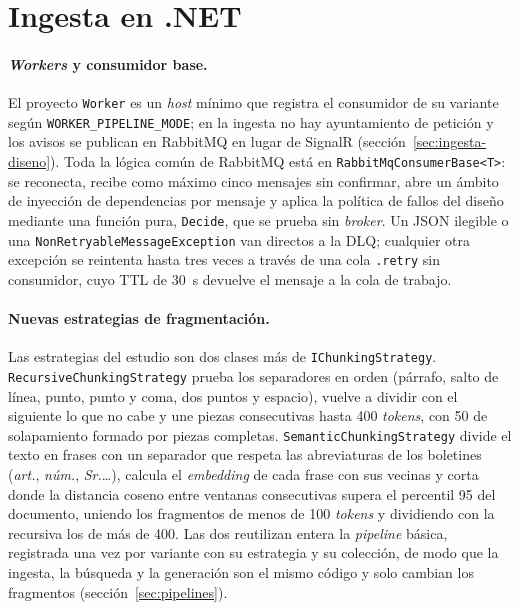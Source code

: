 \section{Ingesta en .NET}
\label{sec:impl-ingesta-detalle}

\paragraph{\emph{Workers} y consumidor base.} El proyecto \texttt{Worker} es un \emph{host} mínimo que registra el consumidor de su variante según \texttt{WORKER\_PIPELINE\_MODE}; en la ingesta no hay ayuntamiento de petición y los avisos se publican en RabbitMQ en lugar de SignalR (sección~\ref{sec:ingesta-diseno}). Toda la lógica común de RabbitMQ está en \texttt{RabbitMqConsumerBase<T>}: se reconecta, recibe como máximo cinco mensajes sin confirmar, abre un ámbito de inyección de dependencias por mensaje y aplica la política de fallos del diseño mediante una función pura, \texttt{Decide}, que se prueba sin \emph{broker}. Un JSON ilegible o una \texttt{NonRetryableMessageException} van directos a la DLQ; cualquier otra excepción se reintenta hasta tres veces a través de una cola \texttt{.retry} sin consumidor, cuyo TTL de 30~s devuelve el mensaje a la cola de trabajo.

\paragraph{Nuevas estrategias de fragmentación.} Las estrategias del estudio son dos clases más de \texttt{IChunkingStrategy}. \texttt{RecursiveChunkingStrategy} prueba los separadores en orden (párrafo, salto de línea, punto, punto y coma, dos puntos y espacio), vuelve a dividir con el siguiente lo que no cabe y une piezas consecutivas hasta 400 \emph{tokens}, con 50 de solapamiento formado por piezas completas. \texttt{SemanticChunkingStrategy} divide el texto en frases con un separador que respeta las abreviaturas de los boletines (\emph{art.}, \emph{núm.}, \emph{Sr.}\ldots), calcula el \emph{embedding} de cada frase con sus vecinas y corta donde la distancia coseno entre ventanas consecutivas supera el percentil 95 del documento, uniendo los fragmentos de menos de 100 \emph{tokens} y dividiendo con la recursiva los de más de 400. Las dos reutilizan entera la \emph{pipeline} básica, registrada una vez por variante con su estrategia y su colección, de modo que la ingesta, la búsqueda y la generación son el mismo código y solo cambian los fragmentos (sección~\ref{sec:pipelines}).

